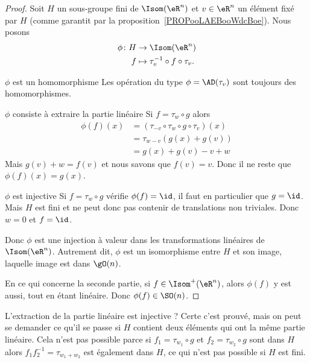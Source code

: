 \begin{proof}
    Soit \( H\) un sous-groupe fini de \( \Isom(\eR^n)\) et \( v\in \eR^n\) un élément fixé par \( H\) (comme garantit par la proposition~\ref{PROPooLAEBooWdcBoe}). Nous posons
    \begin{equation}
        \begin{aligned}
            \phi\colon H&\to \Isom(\eR^n) \\
            f&\mapsto \tau_v^{-1}\circ f\circ \tau_v.
        \end{aligned}
    \end{equation}

    \begin{subproof}
        \item[\( \phi\) est un homomorphisme]
            Les opération du type \( \phi=\AD(\tau_v)\) sont toujours des homomorphismes.
        \item[\( \phi\) consiste à extraire la partie linéaire]
            Si \( f=\tau_w\circ g\) alors
            \begin{subequations}
                \begin{align}
                    \phi(f)(x)&=(\tau_{-v}\circ\tau_w\circ g\circ\tau_v)(x)\\
                    &=\tau_{w-v}(   g(x)+g(v)  )\\
                    &=g(x)+g(v)-v+w
                \end{align}
            \end{subequations}
            Mais \( g(v)+w=f(v)\) et nous savons que \( f(v)=v\). Donc il ne reste que \( \phi(f)(x)=g(x)\).
        \item[\( \phi\) est injective]
            Si \( f=\tau_w\circ g\) vérifie \( \phi(f)=\id\), il faut en particulier que \( g=\id\). Mais \( H\) est fini et ne peut donc pas contenir de translations non triviales. Donc \( w=0\) et \( f=\id\).
    \end{subproof}
    Donc \( \phi\) est une injection à valeur dans les transformations linéaires de \( \Isom(\eR^n)\). Autrement dit, \( \phi\) est un isomorphisme entre \( H\) et son image, laquelle image est dans \( \gO(n)\).

    En ce qui concerne la seconde partie, si \( f\in\Isom^+(\eR^n)\), alors \( \phi(f)\) y est aussi, tout en étant linéaire. Donc \( \phi(f)\in \SO(n)\).
\end{proof}

L'extraction de la partie linéaire est injective ? Certe c'est prouvé, mais on peut se demander ce qu'il se passe si \( H\) contient deux éléments qui ont la même partie linéaire. Cela n'est pas possible parce si \( f_1=\tau_{w_1}\circ g\) et \( f_2=\tau_{w_2}\circ g\) sont dans \( H\) alors \( f_1f_2^{-1}=\tau_{w_1+w_2}\) est également dans \( H\), ce qui n'est pas possible si \( H\) est fini.
 
